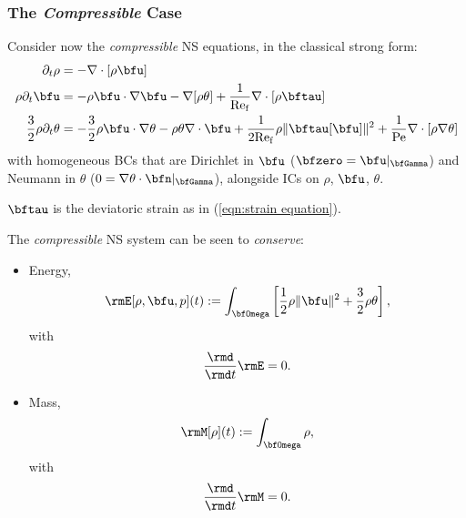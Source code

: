 \subsubsection*{The \emph{Compressible} Case}
    Consider now the \emph{compressible} NS equations, in the classical strong form:
    \begin{align}
                           \partial_{t}\rho  &=  - \nabla\cdot[\rho\bfu]  \label{eqn:compressible NS mass equation}  \\
                       \rho\partial_{t}\bfu  &=  - \rho\bfu\cdot\nabla\bfu - \nabla[\rho\theta] + \frac{1}{\rmRef}\nabla\cdot[\rho\bftau]  \label{eqn:compressible NS momentum equation}  \\
        \frac{3}{2}\rho\partial_{t}\theta  &=  - \frac{3}{2}\rho\bfu\cdot\nabla\theta - \rho\theta\nabla\cdot\bfu + \frac{1}{2\rmRef}\rho\|\bftau[\bfu]\|^{2} + \frac{1}{\rmPe}\nabla\cdot[\rho\nabla\theta]  \label{eqn:compressible NS energy equation}
    \end{align}
    with homogeneous BCs that are Dirichlet in $\bfu$ ($\bfzero  =  \bfu|_{\bfGamma}$) and Neumann in $\theta$ ($0  =  \nabla\theta\cdot\bfn|_{\bfGamma}$), alongside ICs on $\rho$, $\bfu$, $\theta$.
    
    $\bftau$ is the deviatoric strain as in (\ref{eqn:strain equation}).

    \shortline

    The \emph{compressible} NS system can be seen to \emph{conserve}:
    \begin{itemize}
        \item  Energy,
        \begin{equation}\label{eqn:compressible NS energy definition}
            \rmE[\rho, \bfu, p](t)  :=  \int_{\bfOmega}\left[\frac{1}{2}\rho\|\bfu\|^{2} + \frac{3}{2}\rho\theta\right],
        \end{equation}
        with
        \begin{equation}
            \frac{\rmd}{\rmd t}\rmE  =  0.
        \end{equation}
        \item  Mass,
        \begin{equation}\label{eqn:compressible NS mass definition}
            \rmM[\rho](t)  :=  \int_{\bfOmega}\rho,
        \end{equation}
        with
        \begin{equation}
            \frac{\rmd}{\rmd t}\rmM  =  0.
        \end{equation}
    \end{itemize}

